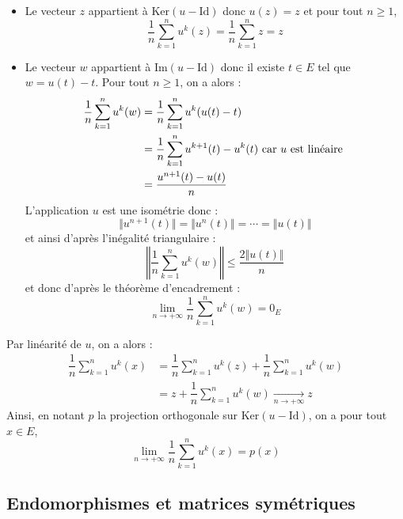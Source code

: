 \documentclass[a4paper,twoside,french,11pt]{VcCours}
\begin{document}
\begin{itemize}
\item Le vecteur $z$ appartient à $\textrm{Ker}(u-\textrm{Id})$ donc $u(z)=z$ et pour tout $n \geq 1$,
$$ \dfrac{1}{n} \sum_{k=1}^n u^k(z) = \dfrac{1}{n} \sum_{k=1}^n z = z$$
\item Le vecteur $w$ appartient à $\textrm{Im}(u-\textrm{Id})$ donc il existe $t \in E$ tel que $w=u(t)-t$. Pour tout $n \geq 1$, on a alors :
\begin{align*}
 \dfrac{1}{n} \sum_{k=1}^n u^k(w) & =  \dfrac{1}{n} \sum_{k=1}^n u^k(u(t)-t) \\
 & = \dfrac{1}{n} \sum_{k=1}^n u^{k+1}(t) - u^k(t) \hbox{ car } u \hbox{ est linéaire } \\
 & = \dfrac{u^{n+1}(t)- u(t)}{n}
\end{align*}
L'application $u$ est une isométrie donc :
$$ \Vert u^{n+1}(t) \Vert = \Vert u^{n}(t) \Vert = \cdots  =\Vert u(t) \Vert $$
et ainsi d'après l'inégalité triangulaire :
$$ \left\Vert  \dfrac{1}{n} \sum_{k=1}^n u^k(w) \right\Vert \leq \dfrac{2\Vert u(t) \Vert}{n}$$
et donc d'après le théorème d'encadrement :
$$ \lim_{n \rightarrow + \infty}  \dfrac{1}{n} \sum_{k=1}^n u^k(w) = 0_E$$
\end{itemize}
Par linéarité de $u$, on a alors :
\begin{align*}
\dfrac{1}{n} \sum_{k=1}^n u^k(x) & =  \dfrac{1}{n} \sum_{k=1}^n u^k(z) +  \dfrac{1}{n} \sum_{k=1}^n u^k(w) \\
& =z + \dfrac{1}{n} \sum_{k=1}^n u^k(w) \underset{ n \rightarrow + \infty}{\longrightarrow} z
\end{align*}
Ainsi, en notant $p$ la projection orthogonale sur $\textrm{Ker}(u- \textrm{Id})$, on a pour tout $x \in E$,
$$ \lim_{n \rightarrow + \infty} \dfrac{1}{n} \sum_{k=1}^n u^k(x) =  p(x)$$



\subsection{Endomorphismes et matrices symétriques}
\end{document}
